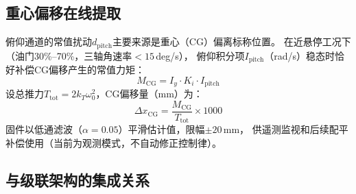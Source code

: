 \subsection{重心偏移在线提取}
\label{sec:cg_extraction}

俯仰通道的常值扰动$d_{\mathrm{pitch}}$主要来源是重心（CG）偏离标称位置。
在近悬停工况下（油门30\%--70\%，三轴角速率$<15$\,deg/s），
俯仰积分项$I_{\mathrm{pitch}}$（rad/s）稳态时恰好补偿CG偏移产生的常值力矩：
\begin{equation}
    M_{\mathrm{CG}} = I_y\cdot K_i\cdot I_{\mathrm{pitch}}
    \label{eq:cg_moment}
\end{equation}
设总推力$T_{\mathrm{tot}}=2k_T\omega_0^2$，CG偏移量（mm）为：
\begin{equation}
    \Delta x_{\mathrm{CG}} = \frac{M_{\mathrm{CG}}}{T_{\mathrm{tot}}}\times1000
    \label{eq:cg_offset}
\end{equation}
固件以低通滤波（$\alpha=0.05$）平滑估计值，限幅$\pm20$\,mm，
供遥测监视和后续配平补偿使用（当前为观测模式，不自动修正控制律）。

\subsection{与级联架构的集成关系}
\label{sec:adrc_integration}

